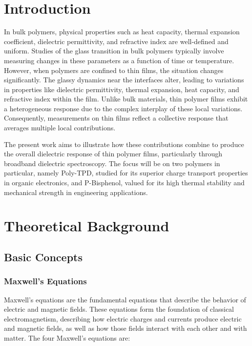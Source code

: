 \chapter{Introduction}

In bulk polymers, physical properties such as heat capacity, thermal expansion coefficient, dielectric permittivity, and refractive index are well-defined and uniform. Studies of the glass transition in bulk polymers typically involve measuring changes in these parameters as a function of time or temperature. However, when polymers are confined to thin films, the situation changes significantly. The glassy dynamics near the interfaces alter, leading to variations in properties like dielectric permittivity, thermal expansion, heat capacity, and refractive index within the film. Unlike bulk materials, thin polymer films exhibit a heterogeneous response due to the complex interplay of these local variations. Consequently, measurements on thin films reflect a collective response that averages multiple local contributions.

The present work aims to illustrate how these contributions combine to produce the overall dielectric response of thin polymer films, particularly through broadband dielectric spectroscopy. The focus will be on two polymers in particular, namely Poly-TPD, studied for its superior charge transport properties in organic electronics, and P-Bisphenol, valued for its high thermal stability and mechanical strength in engineering applications.
\chapter{Theoretical Background}
\section{Basic Concepts}
\subsection{Maxwell's Equations}

Maxwell's equations are the fundamental equations that describe the behavior of electric and magnetic fields. These equations form the foundation of classical electromagnetism, describing how electric charges and currents produce electric and magnetic fields, as well as how those fields interact with each other and with matter. The four Maxwell's equations are:

